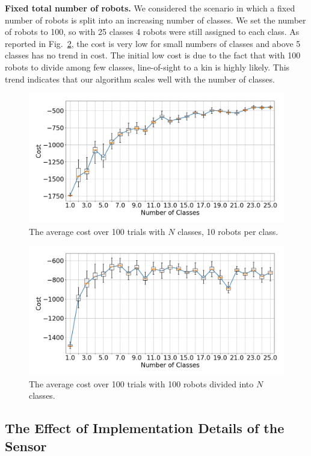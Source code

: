 \documentclass[letterpaper, 10 pt, conference]{ieeeconf}
\newcommand{\myparagraph}[1]{\textbf{#1.}}
\begin{document}
\myparagraph{Fixed total number of robots}
We considered the scenario in which a fixed number of robots is split into an
increasing number of classes. We set the number of robots to 100, so with 25
classes 4 robots were still assigned to each class. As reported in
Fig.~\ref{fig:num_classes_100}, the cost is very low for small numbers of classes
and above 5 classes has no trend in cost. The initial low cost is due to the fact that
with 100 robots to divide among few classes, line-of-sight to a kin is highly likely.
This trend indicates that our algorithm scales well with the number of classes.

\begin{figure}[t]
  \centering
  \includegraphics[width=0.9\linewidth]{./images/num_classes_vs_cost_10_per_class}
  \caption{The average cost over 100 trials with $N$ classes, 10 robots per class.}
  \label{fig:num_classes_10}
\end{figure}

\begin{figure}[t]
  \centering
  \includegraphics[width=0.9\linewidth]{./images/num_classes_vs_cost_100_robots}
  \caption{The average cost over 100 trials with 100 robots divided into $N$ classes.}
  \label{fig:num_classes_100}
\end{figure}

\subsection{The Effect of Implementation Details of the Sensor} \label{section:sensor_impl}
\end{document}
